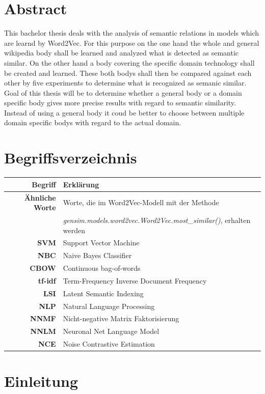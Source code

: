 \documentclass[12pt,a4paper]{report}
\begin{document}
\chapter*{Abstract}
This bachelor thesis deals with the analysis of semantic relations in models which are learnd by Word2Vec.
For this purpose on the one hand the whole and general wikipedia body shall be learned and analyzed what is detected as semantic similar. On the other hand a body covering the specific domain technology shall be created and learned.
These both bodys shall then be compared against each other by five experiments to determine what is recognized as semanic similar.\\
Goal of this thesis will be to determine whether a general body or a domain specific body gives more precise results with regard to semantic similarity. Instead of using a general body it coud be better to choose between multiple domain specific bodys with regard to the actual domain.

\newpage
\tableofcontents
\newpage
\chapter*{Begriffsverzeichnis}
	\begin{tabular}{r|l}	
	\textbf{Begriff} & Erklärung\\
	\hline	
	\textbf{Ähnliche Worte} & Worte, die im Word2Vec-Modell mit der Methode\\
	&  \textit{gensim.models.word2vec.Word2Vec.most\_similar()}, erhalten werden\\
	\textbf{SVM} & Support Vector Machine\\
	\textbf{NBC} & Naive Bayes Classifier\\
	\textbf{CBOW} & Continuous bag-of-words\\
	\textbf{tf-idf} & Term-Frequency Inverse Document Frequency\\
	\textbf{LSI} & Latent Semantic Indexing\\
	\textbf{NLP} & Natural Language Processing\\
	\textbf{NNMF} & Nicht-negative Matrix Faktorisierung\\
	\textbf{NNLM} & Neuronal Net Language Model\\
	\textbf{NCE} & Noise Contrastive Estimation\\
	

\end{tabular}
\newpage
{}
\chapter{Einleitung}
\end{document}

